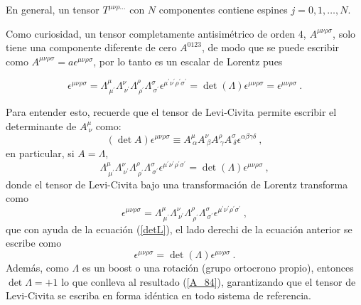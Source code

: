 En general, un tensor $T^{\mu \nu \rho \ldots} $ con $N$ componentes contiene espines $j=0,1,\ldots,N.$

Como curiosidad, un tensor completamente antisimétrico de orden $4$, $A^{\mu \nu \rho \sigma}$, solo tiene una componente diferente de cero $A^{0123}$, de modo que se puede escribir como $A^{\mu \nu \rho \sigma} = a\epsilon^{\mu \nu \rho \sigma}$, por lo tanto es un escalar de Lorentz pues

\begin{equation}
    \epsilon^{\mu \nu \rho \sigma} = \Lambda^{\mu}_{~\mu^{\prime}} \Lambda^{\nu}_{~\nu^{\prime}} \Lambda^{\rho}_{~\rho^{\prime}} \Lambda^{\sigma}_{~\sigma^{\prime}} \epsilon^{\mu^{\prime} \nu^{\prime} \rho^{\prime} \sigma^{\prime}}=\det(\Lambda)\epsilon^{\mu \nu \rho \sigma}=\epsilon^{\mu \nu \rho \sigma}~.
    \label{A_84}
\end{equation}

Para entender esto, recuerde que el tensor de Levi-Civita permite escribir el determinante de $A^{\mu}_{~\nu}$ como:
\begin{equation}
    (\det A) \epsilon^{\mu \nu \rho \sigma} \equiv A_{~\alpha}^{\mu} A_{~\beta}^{\nu} A_{~\gamma}^{\rho} A_{~\delta}^{\sigma}\epsilon^{\alpha \beta \gamma \delta}~,
 \end{equation}
en particular, si $A=\Lambda$,
\begin{equation}
    \Lambda^{\mu}_{~\mu^{\prime}} \Lambda^{\nu}_{~\nu^{\prime}} \Lambda^{\rho}_{~\rho^{\prime}} \Lambda^{\sigma}_{~\sigma^{\prime}} \epsilon^{\mu^{\prime} \nu^{\prime} \rho^{\prime} \sigma^{\prime}} = \det(\Lambda) \epsilon^{\mu \nu \rho \sigma}~,
    \label{detL}
\end{equation}
donde el tensor de Levi-Civita bajo una transformación de Lorentz transforma como
\begin{equation}
    \epsilon^{\mu \nu \rho \sigma} = \Lambda^{\mu}_{~\mu^{\prime}} \Lambda^{\nu}_{~\nu^{\prime}} \Lambda^{\rho}_{~\rho^{\prime}} \Lambda^{\sigma}_{~\sigma^{\prime}} \epsilon^{\mu^{\prime} \nu^{\prime} \rho^{\prime} \sigma^{\prime}}~,
\end{equation}
que con ayuda de la ecuación (\ref{detL}), el lado derechi de la ecuación anterior se escribe como
\begin{equation}
    \epsilon^{\mu \nu \rho \sigma} = \det(\Lambda) \epsilon^{\mu \nu \rho \sigma}~.
\end{equation}
Además, como $\Lambda$ es un boost o una rotación (grupo ortocrono propio), entonces $\det \Lambda = +1$ lo que conlleva al resultado (\ref{A_84}), garantizando que el tensor de Levi-Civita se escriba en forma idéntica en todo sistema de referencia.\\

